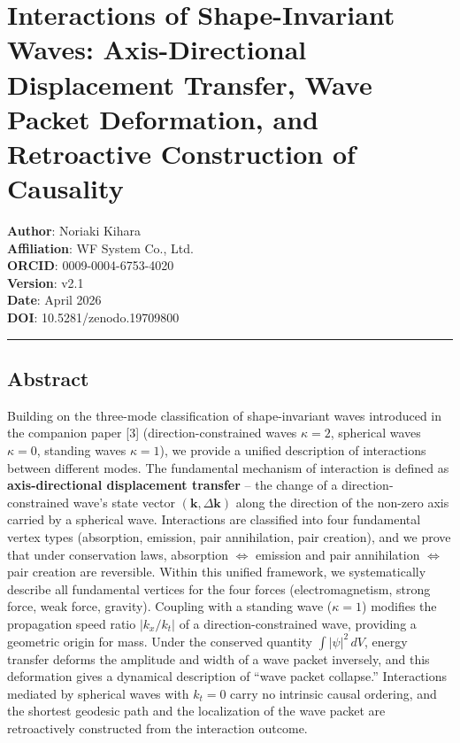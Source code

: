 \documentclass[
  a4paper,11pt]{article}
\theoremstyle{definition}
\theoremstyle{remark}
\begin{document}
\section{Interactions of Shape-Invariant Waves: Axis-Directional
Displacement Transfer, Wave Packet Deformation, and Retroactive
Construction of
Causality}\label{interactions-of-shape-invariant-waves-axis-directional-displacement-transfer-wave-packet-deformation-and-retroactive-construction-of-causality}

\textbf{Author}: Noriaki Kihara\\
\textbf{Affiliation}: WF System Co., Ltd.\\
\textbf{ORCID}: 0009-0004-6753-4020\\
\textbf{Version}: v2.1\\
\textbf{Date}: April 2026\\
\textbf{DOI}: 10.5281/zenodo.19709800

\begin{center}\rule{0.5\linewidth}{0.5pt}\end{center}

\subsection{Abstract}\label{abstract}

Building on the three-mode classification of shape-invariant waves
introduced in the companion paper {[}3{]} (direction-constrained waves
\(\kappa = 2\), spherical waves \(\kappa = 0\), standing waves
\(\kappa = 1\)), we provide a unified description of interactions
between different modes. The fundamental mechanism of interaction is
defined as \textbf{axis-directional displacement transfer} -- the change
of a direction-constrained wave's state vector
\((\mathbf{k}, \Delta\mathbf{k})\) along the direction of the non-zero
axis carried by a spherical wave. Interactions are classified into four
fundamental vertex types (absorption, emission, pair annihilation, pair
creation), and we prove that under conservation laws, absorption
\(\Leftrightarrow\) emission and pair annihilation \(\Leftrightarrow\)
pair creation are reversible. Within this unified framework, we
systematically describe all fundamental vertices for the four forces
(electromagnetism, strong force, weak force, gravity). Coupling with a
standing wave (\(\kappa = 1\)) modifies the propagation speed ratio
\(|k_x / k_t|\) of a direction-constrained wave, providing a geometric
origin for mass. Under the conserved quantity \(\int |\psi|^2 \, dV\),
energy transfer deforms the amplitude and width of a wave packet
inversely, and this deformation gives a dynamical description of ``wave
packet collapse.'' Interactions mediated by spherical waves with
\(k_t = 0\) carry no intrinsic causal ordering, and the shortest
geodesic path and the localization of the wave packet are retroactively
constructed from the interaction outcome.
\end{document}
